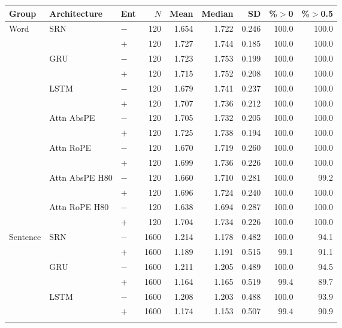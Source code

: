 \begin{table}[t]
\centering\footnotesize
\begin{tabular}{@{}lllrrrrrr@{}}
\toprule
\textbf{Group} & \textbf{Architecture} & \textbf{Ent} & \textbf{$N$} & \textbf{Mean} & \textbf{Median} & \textbf{SD} & \textbf{\%${>}$0} & \textbf{\%${>}$0.5} \\
\midrule
Word & SRN & $-$ & 120 & 1.654 & 1.722 & 0.246 & 100.0 & 100.0 \\
 &  & $+$ & 120 & 1.727 & 1.744 & 0.185 & 100.0 & 100.0 \\
\addlinespace[1pt]
 & GRU & $-$ & 120 & 1.723 & 1.753 & 0.199 & 100.0 & 100.0 \\
 &  & $+$ & 120 & 1.715 & 1.752 & 0.208 & 100.0 & 100.0 \\
\addlinespace[1pt]
 & LSTM & $-$ & 120 & 1.679 & 1.741 & 0.237 & 100.0 & 100.0 \\
 &  & $+$ & 120 & 1.707 & 1.736 & 0.212 & 100.0 & 100.0 \\
\addlinespace[1pt]
 & Attn AbsPE & $-$ & 120 & 1.705 & 1.732 & 0.205 & 100.0 & 100.0 \\
 &  & $+$ & 120 & 1.725 & 1.738 & 0.194 & 100.0 & 100.0 \\
\addlinespace[1pt]
 & Attn RoPE & $-$ & 120 & 1.670 & 1.719 & 0.260 & 100.0 & 100.0 \\
 &  & $+$ & 120 & 1.699 & 1.736 & 0.226 & 100.0 & 100.0 \\
\addlinespace[1pt]
 & Attn AbsPE H80 & $-$ & 120 & 1.660 & 1.710 & 0.281 & 100.0 & 99.2 \\
 &  & $+$ & 120 & 1.696 & 1.724 & 0.240 & 100.0 & 100.0 \\
\addlinespace[1pt]
 & Attn RoPE H80 & $-$ & 120 & 1.638 & 1.694 & 0.287 & 100.0 & 100.0 \\
 &  & $+$ & 120 & 1.704 & 1.734 & 0.226 & 100.0 & 100.0 \\
\addlinespace
Sentence & SRN & $-$ & 1600 & 1.214 & 1.178 & 0.482 & 100.0 & 94.1 \\
 &  & $+$ & 1600 & 1.189 & 1.191 & 0.515 & 99.1 & 91.1 \\
\addlinespace[1pt]
 & GRU & $-$ & 1600 & 1.211 & 1.205 & 0.489 & 100.0 & 94.5 \\
 &  & $+$ & 1600 & 1.164 & 1.165 & 0.519 & 99.4 & 89.7 \\
\addlinespace[1pt]
 & LSTM & $-$ & 1600 & 1.208 & 1.203 & 0.488 & 100.0 & 93.9 \\
 &  & $+$ & 1600 & 1.174 & 1.153 & 0.507 & 99.4 & 90.9 \\
\addlinespace[1pt]

\end{tabular}
\end{table}
